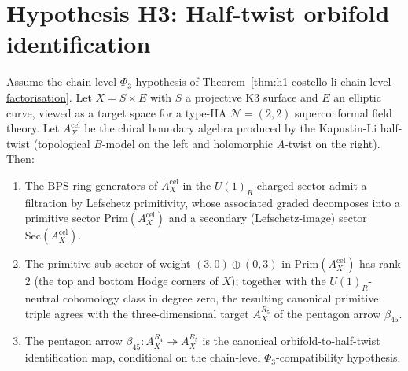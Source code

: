 \section{Hypothesis H3: Half-twist orbifold identification}
\label{sec:h3-half-twist-orbifold}

\begin{theorem}
\label{thm:h3-half-twist-orbifold-identification}
Assume the chain-level $\Phi_3$-hypothesis of
Theorem~\ref{thm:h1-costello-li-chain-level-factorisation}.
Let $X = S \times E$ with $S$ a projective K3 surface and $E$ an elliptic
curve, viewed as a target space for a type-IIA $\mathcal{N} = (2, 2)$
superconformal field theory. Let $A^{\mathrm{cel}}_X$ be the chiral boundary
algebra produced by the Kapustin-Li half-twist (topological $B$-model on the
left and holomorphic $A$-twist on the right). Then:
\begin{enumerate}[label=\textup{(\roman*)}]
 \item The BPS-ring generators of $A^{\mathrm{cel}}_X$ in the $U(1)_R$-charged
 sector admit a filtration by Lefschetz primitivity, whose associated
 graded decomposes into a primitive sector
 $\mathrm{Prim}(A^{\mathrm{cel}}_X)$ and a secondary (Lefschetz-image)
 sector $\mathrm{Sec}(A^{\mathrm{cel}}_X)$.
 \item The primitive sub-sector of weight $(3, 0) \oplus (0, 3)$ in
 $\mathrm{Prim}(A^{\mathrm{cel}}_X)$ has rank $2$ (the top and bottom
 Hodge corners of $X$); together with the $U(1)_R$-neutral
 cohomology class in degree zero, the resulting canonical primitive
 triple agrees with the three-dimensional target
 $A_X^{R_5}$ of the pentagon arrow $\beta_{45}$.
 \item The pentagon arrow
 $\beta_{45}: A_X^{R_4} \twoheadrightarrow A_X^{R_5}$ is the
 canonical orbifold-to-half-twist identification map, conditional on
 the chain-level $\Phi_3$-compatibility hypothesis.
\end{enumerate}
\end{theorem}

